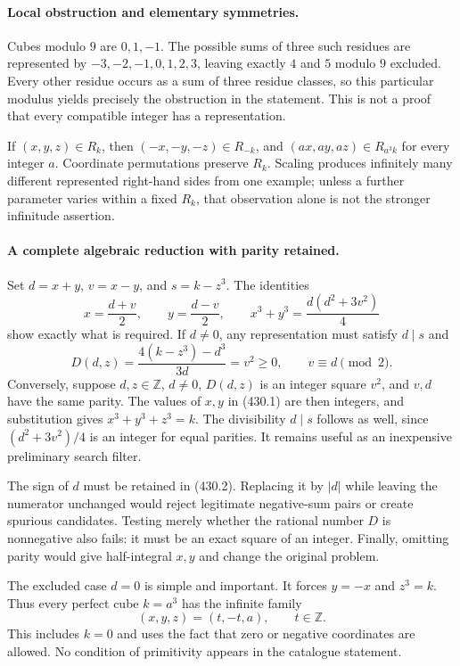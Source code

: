 \documentclass[11pt]{article}
\begin{document}
\paragraph{Local obstruction and elementary symmetries.}
Cubes modulo $9$ are $0,1,-1$. The possible sums of three such residues are represented by $-3,-2,-1,0,1,2,3$, leaving exactly $4$ and $5$ modulo $9$ excluded. Every other residue occurs as a sum of three residue classes, so this particular modulus yields precisely the obstruction in the statement. This is not a proof that every compatible integer has a representation.

If $(x,y,z)\in R_k$, then $(-x,-y,-z)\in R_{-k}$, and $(ax,ay,az)\in R_{a^3k}$ for every integer $a$. Coordinate permutations preserve $R_k$. Scaling produces infinitely many different represented right-hand sides from one example; unless a further parameter varies within a fixed $R_k$, that observation alone is not the stronger infinitude assertion.

\paragraph{A complete algebraic reduction with parity retained.}
Set $d=x+y$, $v=x-y$, and $s=k-z^3$. The identities
\[
 x=\frac{d+v}{2},\qquad y=\frac{d-v}{2},\qquad
 x^3+y^3=\frac{d(d^2+3v^2)}4
 \tag{430.1}
\]
show exactly what is required. If $d\ne0$, any representation must satisfy $d\mid s$ and
\[
 D(d,z)=\frac{4(k-z^3)-d^3}{3d}=v^2\ge0,
 \qquad v\equiv d\pmod2. \tag{430.2}
\]
Conversely, suppose $d,z\in\mathbb Z$, $d\ne0$, $D(d,z)$ is an integer square $v^2$, and $v,d$ have the same parity. The values of $x,y$ in (430.1) are then integers, and substitution gives $x^3+y^3+z^3=k$. The divisibility $d\mid s$ follows as well, since $(d^2+3v^2)/4$ is an integer for equal parities. It remains useful as an inexpensive preliminary search filter.

The sign of $d$ must be retained in (430.2). Replacing it by $|d|$ while leaving the numerator unchanged would reject legitimate negative-sum pairs or create spurious candidates. Testing merely whether the rational number $D$ is nonnegative also fails: it must be an exact square of an integer. Finally, omitting parity would give half-integral $x,y$ and change the original problem.

The excluded case $d=0$ is simple and important. It forces $y=-x$ and $z^3=k$. Thus every perfect cube $k=a^3$ has the infinite family
\[
 (x,y,z)=(t,-t,a),\qquad t\in\mathbb Z. \tag{430.3}
\]
This includes $k=0$ and uses the fact that zero or negative coordinates are allowed. No condition of primitivity appears in the catalogue statement.
\end{document}
